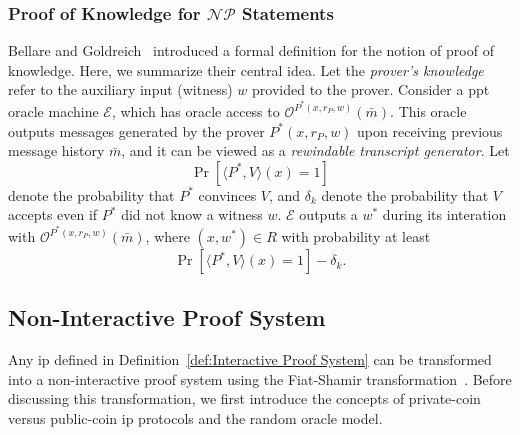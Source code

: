 \subsubsection{Proof of Knowledge for \texorpdfstring{$\mathcal{NP}$}{NP} Statements}

Bellare and Goldreich~\cite{Bellare1993ProofsofKnowledge} introduced a formal definition for the notion of proof of knowledge. Here, we summarize their central idea. Let the \textit{prover's knowledge} refer to the auxiliary input (witness) $w$ provided to the prover. Consider a \gls{ppt} oracle machine $\mathcal{E}$, which has oracle access to $\mathcal{O}^{P^*(x, r_P, w)}(\bar{m})$. This oracle outputs messages generated by the prover $P^*(x, r_P, w)$ upon receiving previous message history $\bar{m}$, and it can be viewed as a \textit{rewindable transcript generator}. Let 
\[
\Pr \left[ \langle P^*, V \rangle (x) = 1 \right]
\]
denote the probability that $P^*$ convinces $V$, and $\delta_k$ denote the probability that $V$ accepts even if $P^*$ did not know a witness $w$.  $\mathcal{E}$ outputs a $w^*$ during its interation with $\mathcal{O}^{P^*(x, r_P, w)}(\bar{m})$, where $(x, w^*) \in R$ with probability at least 
\[
\Pr \left[ \langle P^*, V \rangle (x) = 1 \right] - \delta_k.
\]



\subsection{Non-Interactive	Proof System}\label{sec:prel_non_interactive}
Any \gls{ip} defined in Definition~\ref{def:Interactive Proof System} can be transformed into a non-interactive proof system using the Fiat-Shamir transformation~\cite{Fiat1987}. Before discussing this transformation, we first introduce the concepts of private-coin versus public-coin \gls{ip} protocols and the random oracle model.

